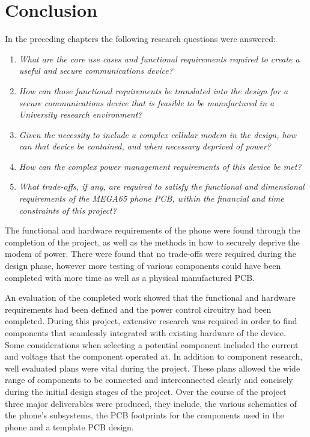 
\chapter{Conclusion} %

\label{Chapter8} %

	In the preceding chapters the following research questions were answered: 
\begin{enumerate}
	\item \textit{What are the core use cases and functional requirements required to create a useful and secure communications device?}
	\item \textit{How can those functional requirements be translated into the design for a secure communications device that is feasible to be manufactured in a University research environment?}
	\item \textit{Given the necessity to include a complex cellular modem in the design, how can that device be contained, and when necessary deprived of power?}
	\item \textit{How can the complex power management requirements of this device be met?}
	\item \textit{What trade-offs, if any, are required to satisfy the functional and dimensional requirements of the MEGA65 phone PCB, within the financial and time constraints of this project?}
\end{enumerate}

	The functional and hardware requirements of the phone were found through the completion of the project, as well as the methods in how to securely deprive the modem of power. 
There were found that no trade-offs were required during the design phase, however more testing of various components could have been completed with more time as well as a physical manufactured PCB.

An evaluation of the completed work showed that the functional and hardware requirements had been defined and the power control circuitry had been completed. During this project, extensive research was required in order to find components that seamlessly integrated with existing hardware of the device. 
Some considerations when selecting a potential component included the current and voltage that the component operated at. 
In addition to component research, well evaluated plans were vital during the project. 
These plans allowed the wide range of components to be connected and interconnected clearly and concisely during the initial design stages of the project. 
Over the course of the project three major deliverables were produced, they include, the various schematics of the phone's subsystems, the PCB footprints for the components used in the phone and a template PCB design. 
	

